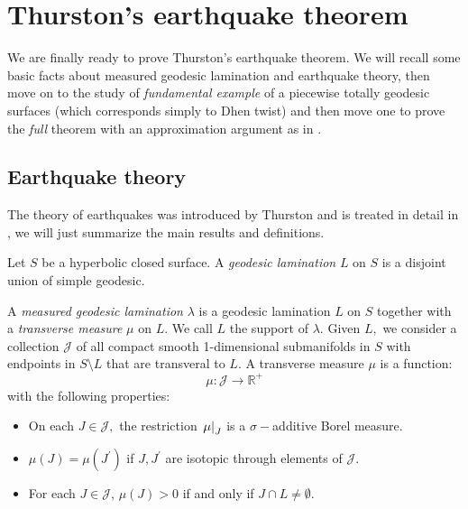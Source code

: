 \chapter{Thurston's earthquake theorem}
We are finally ready to prove Thurston's earthquake theorem. We will recall some basic facts about measured geodesic lamination and earthquake theory, then move on to the study of \textit{fundamental example} of a piecewise totally geodesic surfaces (which corresponds simply to Dhen twist) and then move one to prove the \textit{full} theorem with an approximation argument as in \cite{benedetti2009canonical}. 

\section{Earthquake theory}

The theory of earthquakes was introduced by Thurston and is treated in detail in \cite{kapovich2001hyperbolic}, we will just summarize the main results and definitions. 

\begin{definition}
    Let $S$ be a hyperbolic closed surface. A \textit{geodesic lamination} $L$ on $S$ is a disjoint union of simple geodesic. 
\end{definition}

\begin{definition}
    A \textit{measured geodesic lamination} $\lambda$ is a geodesic lamination $L$ on $S$ together with a \textit{transverse measure} $\mu$ on $L$. We call $L$ the support of $\lambda$. Given $L,$ we consider a collection $\mathcal{J}$ of all compact smooth 1-dimensional submanifolds in $S$ with endpoints in $S\setminus L$ that are transveral to $L$. A transverse measure $\mu$ is a function: 
    \begin{equation}
        \mu: \mathcal{J} \rightarrow \mathbb{R}^+
    \end{equation}
    with the following properties: 
    \begin{itemize}
        \item On each $J\in\mathcal{J},$ the restriction $\left.\mu\right|_{J}$ is a $\sigma-$additive Borel measure. 
        \item $\mu(J)=\mu(J^{\prime})$ if $J,J^{\prime} $ are isotopic through elements of $\mathcal{J}$. 
        \item For each $J\in\mathcal{J}$, $\mu(J)>0$ if and only if $J\cap L\neq \emptyset$.   
    \end{itemize}
\end{definition}

